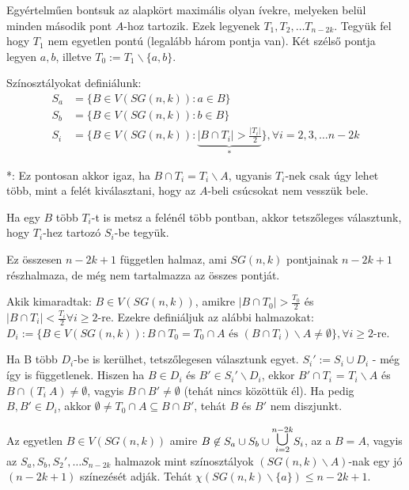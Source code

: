 \medskip

Egyértelműen bontsuk az alapkört maximális olyan ívekre, melyeken belül minden második pont $A$-hoz tartozik. Ezek legyenek $T_1, T_2, \dots T_{n-2k}$. Tegyük fel hogy $T_1$ nem egyetlen pontú (legalább három pontja van). Két szélső pontja legyen $a, b$, illetve $T_0 := T_1 \backslash \{a, b\}$.

\medskip

Színosztályokat definiálunk:
\begin{align}
  S_a &= \{B \in V(SG(n,k)): a \in B\} \\
  S_b &= \{B \in V(SG(n,k)): b \in B\} \\
  S_i &= \{B \in V(SG(n,k)): \underbrace{|B \cap T_i| > \frac{|T_i|}{2}}_{*}\}, \forall i = 2,3, \dots n-2k
\end{align}

*: Ez pontosan akkor igaz, ha $B \cap T_i = T_i \backslash A$, ugyanis $T_i$-nek csak úgy lehet több, mint a felét kiválasztani, hogy az $A$-beli csúcsokat nem vesszük bele.

\medskip

Ha egy $B$ több $T_i$-t is metsz a felénél több pontban, akkor tetszőleges választunk, hogy $T_i$-hez tartozó $S_i$-be tegyük.

\medskip

Ez összesen $n-2k+1$ független halmaz, ami $SG(n,k)$ pontjainak $n-2k+1$ részhalmaza, de még nem tartalmazza az összes pontját.

\medskip

Akik kimaradtak: $B \in V(SG(n,k))$, amikre $|B \cap T_0| > \frac{T_0}{2}$ és $|B \cap T_i| < \frac{T_i}{2} \forall i \geq 2$-re. Ezekre definiáljuk az alábbi halmazokat: $D_i := \{B \in V(SG(n,k)): B \cap T_0 = T_0 \cap A \text{~és~} (B \cap T_i) \backslash A \not = \emptyset\}, \forall i \geq 2$-re.

\medskip

Ha B több $D_i$-be is kerülhet, tetszőlegesen választunk egyet. $S_i' := S_i \cup D_i$ - még így is függetlenek. Hiszen ha $B \in D_i$ és $B' \in S_i' \backslash D_i$, ekkor $B' \cap T_i$ = $T_i \backslash A$ és $B \cap (T_i \ A) \not = \emptyset$, vagyis $B \cap B' \not = \emptyset$ (tehát nincs közöttük él). Ha pedig $B, B' \in D_i$, akkor $\emptyset \not = T_0 \cap A \subseteq B \cap B'$, tehát $B$ és $B'$ nem diszjunkt.

Az egyetlen $B \in V(SG(n,k))$ amire $B \not \in S_a \cup S_b \cup \overset{n-2k}{\underset{i=2}{\text{\LARGE $\cup$}}} S_i$, az a $B=A$, vagyis az $S_a, S_b, S_2', \dots S_{n-2k}$ halmazok mint színosztályok $(SG(n,k) \backslash A)$-nak egy jó $(n-2k+1)$ színezését adják. Tehát $\chi(SG(n,k) \backslash \{a\}) \leq n - 2k + 1$.

\QED

